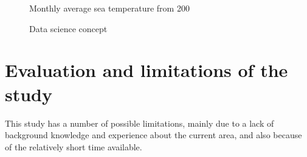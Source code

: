 \begin{figure}[H]
    \caption{Monthly average sea temperature from 200}
    \label{fig: Norway_averageSeaTemp}
\end{figure}

\begin{figure}[H]
    \caption{Data science concept}
    \label{fig: Data_science}
\end{figure}



\section{Evaluation and limitations of the study}
\vspace{-5mm}
This study has a number of possible limitations, mainly due to a lack of background knowledge and experience about the current area, and also because of the relatively short time available.


